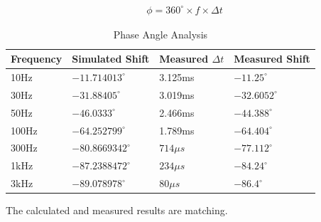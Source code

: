 \begin{align*}
    \phi = 360^{\circ}\times f \times \Delta t
\end{align*}

\newpage
\thispagestyle{plain}

\begin{table}[h]
    \centering
    \begin{tabular}{|l|l|l|l|}
        \hline
        \textbf{Frequency} & \textbf{Simulated Shift} & \textbf{Measured $\Delta t$} & \textbf{Measured Shift} \\ \hline
        10Hz               & $-11.714013   ^{\circ}$  & 3.125ms                      & $-11.25^{\circ}$        \\ \hline
        30Hz               & $-31.88405    ^{\circ}$  & 3.019ms                      & $-32.6052^{\circ}$      \\ \hline
        50Hz               & $-46.0333     ^{\circ}$  & 2.466ms                      & $-44.388^{\circ}$       \\ \hline
        100Hz              & $-64.252799   ^{\circ}$  & 1.789ms                      & $-64.404^{\circ}$       \\ \hline
        300Hz              & $-80.8669342  ^{\circ}$  & $714\mu s$                   & $-77.112^{\circ}$       \\ \hline
        1kHz               & $-87.2388472  ^{\circ}$  & $234\mu s$                   & $-84.24^{\circ}$        \\ \hline
        3kHz               & $-89.078978   ^{\circ}$  & $80\mu s$                    & $-86.4^{\circ}$         \\ \hline
    \end{tabular}
    \caption{Phase Angle Analysis}
\end{table}

The calculated and measured results are matching.
